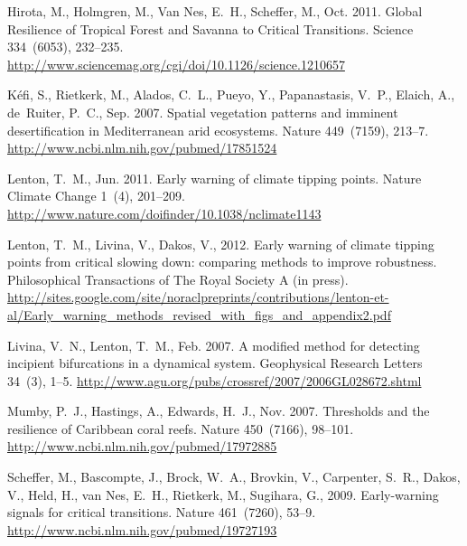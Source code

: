 \documentclass[authoryear,review,12pt]{elsarticle}
\begin{document}
\begin{thebibliography}{24}
Hirota, M., Holmgren, M., {Van Nes}, E.~H., Scheffer, M., Oct. 2011. {Global
  Resilience of Tropical Forest and Savanna to Critical Transitions}. Science
  334~(6053), 232--235.
\newline\urlprefix\url{http://www.sciencemag.org/cgi/doi/10.1126/science.1210657}

K\'{e}fi, S., Rietkerk, M., Alados, C.~L., Pueyo, Y., Papanastasis, V.~P.,
  Elaich, A., de~Ruiter, P.~C., Sep. 2007. {Spatial vegetation patterns and
  imminent desertification in Mediterranean arid ecosystems.} Nature
  449~(7159), 213--7.
\newline\urlprefix\url{http://www.ncbi.nlm.nih.gov/pubmed/17851524}

Lenton, T.~M., Jun. 2011. {Early warning of climate tipping points}. Nature
  Climate Change 1~(4), 201--209.
\newline\urlprefix\url{http://www.nature.com/doifinder/10.1038/nclimate1143}

Lenton, T.~M., Livina, V., Dakos, V., 2012. {Early warning of climate tipping
  points from critical slowing down: comparing methods to improve robustness}.
  Philosophical Transactions of The Royal Society A (in press).
\newline\urlprefix\url{http://sites.google.com/site/noraclpreprints/contributions/lenton-et-al/Early\_warning\_methods\_revised\_with\_figs\_and\_appendix2.pdf}

Livina, V.~N., Lenton, T.~M., Feb. 2007. {A modified method for detecting
  incipient bifurcations in a dynamical system}. Geophysical Research Letters
  34~(3), 1--5.
\newline\urlprefix\url{http://www.agu.org/pubs/crossref/2007/2006GL028672.shtml}

Mumby, P.~J., Hastings, A., Edwards, H.~J., Nov. 2007. {Thresholds and the
  resilience of Caribbean coral reefs.} Nature 450~(7166), 98--101.
\newline\urlprefix\url{http://www.ncbi.nlm.nih.gov/pubmed/17972885}

Scheffer, M., Bascompte, J., Brock, W.~A., Brovkin, V., Carpenter, S.~R.,
  Dakos, V., Held, H., van Nes, E.~H., Rietkerk, M., Sugihara, G., 2009.
  {Early-warning signals for critical transitions.} Nature 461~(7260), 53--9.
\newline\urlprefix\url{http://www.ncbi.nlm.nih.gov/pubmed/19727193}


\end{thebibliography}
\end{document}
